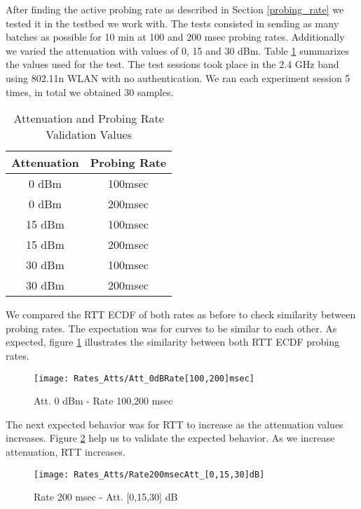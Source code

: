 After finding the active probing rate as described in Section \ref{probing_rate} we tested it in the testbed we work with. The tests consisted in sending as many batches as possible for 10 min at 100 and 200 msec probing rates. Additionally we varied the attenuation with values of 0, 15 and 30 dBm. Table \ref{table:Att_Rate_Test_Values} summarizes the values used for the test. The test sessions took place in the 2.4 GHz band using 802.11n WLAN with no authentication. We ran each experiment session 5 times, in total we obtained 30 samples.

\begin{table}[h]
	\begin{center}
		\begin{tabular}{||c c||}
			\hline
			Attenuation & Probing Rate\\ [0.5ex] 
			\hline\hline
			0 dBm & 100msec\\ 
			\hline
			0 dBm & 200msec\\
			\hline
			15 dBm & 100msec\\
			\hline
			15 dBm & 200msec\\
			\hline
			30 dBm & 100msec\\
			\hline
			30 dBm & 200msec\\ [1ex] 
			\hline
		\end{tabular}
	\end{center}
	\caption{Attenuation and Probing Rate Validation Values}
	\label{table:Att_Rate_Test_Values}
\end{table}

We compared the RTT ECDF of both rates as before to check similarity between probing rates. The expectation was for curves to be similar to each other. As expected, figure \ref{image:att_0_100and200msec} illustrates the similarity between both RTT ECDF probing rates.

\begin{figure}[h]
	\centering
	\texttt{[image: Rates\_Atts/Att\_0dBRate[100,200]msec]}
	\caption{Att. 0 dBm - Rate 100,200 msec}
	\label{image:att_0_100and200msec}
\end{figure}

The next expected behavior was for RTT to increase as the attenuation values increases. Figure \ref{image:rate_200msec_Att_0_15_30dBm} help us to validate the expected behavior. As we increase attenuation, RTT increases.

\begin{figure}[h]
	\centering
	\texttt{[image: Rates\_Atts/Rate200msecAtt\_[0,15,30]dB]}
	\caption{Rate 200 msec - Att. [0,15,30] dB}
	\label{image:rate_200msec_Att_0_15_30dBm}
\end{figure}
\newpage
